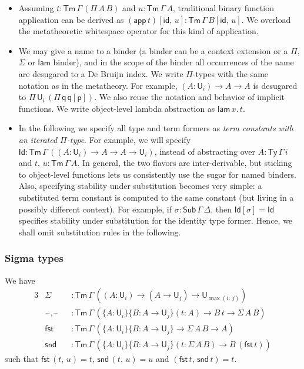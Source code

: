 \documentclass[acmsmall,screen,review]{acmart}
\newcommand{\msf}[1]{{\mathsf{#1}}}
\newcommand{\p}{\mathsf{p}}
\newcommand{\q}{\mathsf{q}}
\newcommand{\U}{\msf{U}}
\newcommand{\blank}{{\mathord{\hspace{1pt}\text{--}\hspace{1pt}}}}
\newcommand{\fst}{\msf{fst}}
\newcommand{\snd}{\msf{snd}}
\newcommand{\id}{\msf{id}}
\newcommand{\Sub}{\msf{Sub}}
\newcommand{\Ty}{\msf{Ty}}
\newcommand{\Tm}{\msf{Tm}}
\newcommand{\lam}{\msf{lam}}
\newcommand{\app}{\msf{app}}
\newcommand{\Id}{\msf{Id}}
\begin{document}
\begin{itemize}
\item Assuming $t : \Tm\,\Gamma\,(\Pi\,A\,B)$ and $u : \Tm\,\Gamma\,A$, traditional binary function
  application can be derived as $(\app\,t)[\id,\,u] : \Tm\,\Gamma\,B[\id,\,u]$. We overload the
  metatheoretic whitespace operator for this kind of application.
\item We may give a name to a binder (a binder can be a context extension or a $\Pi$, $\Sigma$ or
  $\lam$ binder), and in the scope of the binder all occurrences of the name are desugared to a De
  Bruijn index. We write $\Pi$-types with the same notation as in the metatheory. For example, $(A
  : \U_i) \to A \to A$ is desugared to $\Pi\,\U_i\,(\Pi\,\q\,\q[\p])$. We also reuse the notation
  and behavior of implicit functions. We write object-level lambda abstraction as $\lam\,x.\,t$.
\item
  In the following we specify all type and term formers as \emph{term constants with an iterated
  $\Pi$-type}. For example, we will specify $\Id : \Tm\,\Gamma\,((A : \U_i) \to A \to A \to \U_i)$,
  instead of abstracting over $A : \Ty\,\Gamma\,i$ and $t,\,u : \Tm\,\Gamma\,A$. In general, the two
  flavors are inter-derivable, but sticking to object-level functions lets us consistently use the
  sugar for named binders. Also, specifying stability under substitution becomes very simple: a
  substituted term constant is computed to the same constant (but living in a possibly different
  context). For example, if $\sigma : \Sub\,\Gamma\,\Delta$, then $\Id[\sigma] = \Id$ specifies
  stability under substitution for the identity type former. Hence, we shall omit substitution rules
  in the following.
\end{itemize}

\subsubsection{Sigma types} We have
\begin{alignat*}{3}
  &\Sigma        &&: \Tm\,\Gamma\,((A : \U_i) \to (A \to \U_j) \to \U_{\max(i,\,j)}) \\
  &\blank,\blank &&: \Tm\,\Gamma\,(\{A : \U_i\}\{B : A \to \U_j\}(t : A) \to B\,t \to \Sigma\,A\,B)\\
  &\fst          &&: \Tm\,\Gamma\,(\{A : \U_i\}\{B : A \to \U_j\} \to \Sigma\,A\,B \to A)\\
  &\snd          &&: \Tm\,\Gamma\,(\{A : \U_i\}\{B : A \to \U_j\}(t : \Sigma\,A\,B) \to B\,(\fst\,t))
\end{alignat*}
such that $\fst\,(t,\,u) = t$, $\snd\,(t,\,u) = u$ and $(\fst\,t,\,\snd\,t) = t$.
\end{document}
